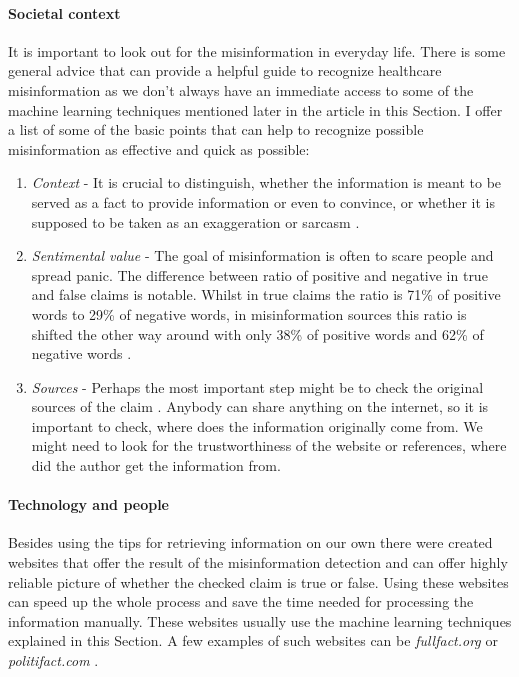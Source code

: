 \documentclass[11pt ,english,a4paper]{article}
\begin{document}
\paragraph{Societal context}%
It is important to look out for the misinformation in everyday life. There is some general advice that can provide a helpful guide to recognize healthcare misinformation as we don't always have an immediate access to some of the machine learning techniques mentioned later in the article in this Section.
I offer a list of some of the basic points that can help to recognize possible misinformation as effective and quick as possible: 
\begin{enumerate}
\item{\emph{Context}} - It is crucial to distinguish, whether the information is meant to be served as a fact to provide information or even to convince, or whether it is supposed to be taken as an exaggeration or sarcasm \cite{alh18fact}.
\item {\emph{Sentimental value}} - The goal of misinformation is often to scare people and spread panic. The difference between ratio of positive and negative in true and false claims is notable. Whilst in true claims the ratio is 71\% of positive words to 29\% of negative words, in misinformation sources this ratio is shifted the other way around with only 38\% of positive words and 62\% of negative words \cite{bar21health}.
\item {\emph{Sources}} - Perhaps the most important step might be to check the original sources of the claim \cite{gra17fact}. Anybody can share anything on the internet, so it is important to check, where does the information originally come from. We might need to look for the trustworthiness of the website or references, where did the author get the information from.
\end{enumerate}

\paragraph{Technology and people}%
Besides using the tips for retrieving information on our own there were created websites that offer the result of the misinformation detection and can offer highly reliable picture of whether the checked claim is true or false. Using these websites can speed up the whole process and save the time needed for processing the information manually. These websites usually use the machine learning techniques explained in this Section. A few examples of such websites can be \emph{fullfact.org} or \emph{politifact.com} \cite{alh18fact}.
\end{document}
